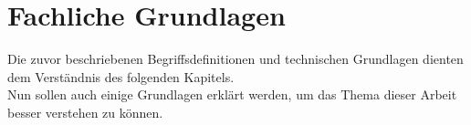 \section{Fachliche Grundlagen}
Die zuvor beschriebenen Begriffsdefinitionen und technischen Grundlagen dienten dem Verständnis des folgenden Kapitels. \\ 
Nun sollen auch einige Grundlagen erklärt werden, um das Thema dieser Arbeit besser verstehen zu können.



